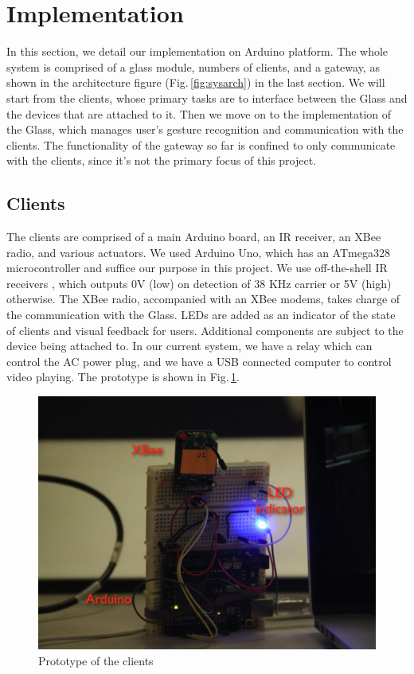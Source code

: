 \section{Implementation}
\label{sec:implementation}

In this section, we detail our implementation on Arduino \cite{Arduino} platform. The whole system is comprised of a glass module, numbers of clients, and a gateway, as shown in the architecture figure (Fig.\,\ref{fig:sysarch}) in the last section. We will start from the clients, whose primary tasks are to interface between the Glass and the devices that are attached to it. Then we move on to the implementation of the Glass, which manages user's gesture recognition and communication with the clients. The functionality of the gateway so far is confined to only communicate with the clients, since it's not the primary focus of this project.

\subsection{Clients}
The clients are comprised of a main Arduino board, an IR receiver, an XBee radio, and various actuators. We used Arduino Uno, which has an ATmega328 microcontroller and suffice our purpose in this project. We use off-the-shell IR receivers %
, which outputs 0V (low) on detection of 38 KHz carrier or 5V (high) otherwise. The XBee radio, accompanied with an XBee modems, takes charge of the communication with the Glass. LEDs are added as an indicator of the state of clients and visual feedback for users. Additional components are subject to the device being attached to. In our current system, we have a relay %
which can control the AC power plug, and we have a USB connected computer to control video playing. The prototype is shown in Fig.\,\ref{fig:client}.

\begin{figure}
  \centering
  \includegraphics[width=\linewidth]{../figs/client.png}
  \caption{Prototype of the clients}
  \label{fig:client}
\end{figure}

